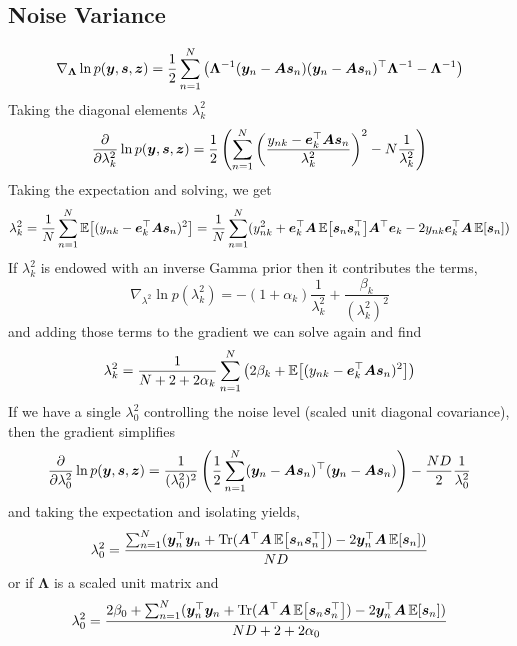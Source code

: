 \documentclass{article}
\newcommand{\mix}{\bm{A}}
\newcommand{\source}{s}
\newcommand{\sourcevec}{\bm{\source}}
\newcommand{\obs}{y}
\newcommand{\obsvec}{\bm{\obs}}
\newcommand{\assign}{z}
\newcommand{\assignvec}{\bm{\assign}}
\newcommand{\noisecov}{\bm{\Lambda}}
\newcommand{\noisescalesq}{\lambda^2}
\begin{document}
\subsection{Noise Variance}
\begin{equation}
\nabla_{\noisecov}\ln p(\obsvec,\sourcevec,\assignvec)=\frac{1}{2}\sum_{n=1}^{N}\left(\noisecov^{-1}(\obsvec_n-\mix\sourcevec_n)(\obsvec_n-\mix\sourcevec_n)\T\noisecov^{-1}-\noisecov^{-1}\right)
\end{equation}
Taking the diagonal elements $\noisescalesq_k$
\begin{equation}
\pdv{\noisescalesq_{k}}\ln p(\obsvec,\sourcevec,\assignvec)=\frac{1}{2}\left(\sum_{n=1}^{N}\left(\frac{\obs_{nk}-\bm{e}_k\T\mix\sourcevec_n}{\noisescalesq_{k}}\right)^2-N\frac{1}{\noisescalesq_k}\right)
\end{equation}
Taking the expectation and solving, we get
\begin{equation}
\noisescalesq_k=\frac{1}{N}\sum_{n=1}^{N}\E{(\obs_{nk}-\bm{e}_k\T\mix\sourcevec_n)^2}=\frac{1}{N}\sum_{n=1}^{N}(\obs_{nk}^2+\bm{e}_k\T\mix\E{\sourcevec_n\sourcevec_n\T}\mix\T\bm{e}_k-2\obs_{nk}\bm{e}_k\T\mix\E{\sourcevec_n})
\end{equation}
If $\noisescalesq_k$ is endowed with an inverse Gamma prior then it contributes the terms,
\begin{equation}
\nabla_{\noisescalesq}\ln p(\noisescalesq_k)=-(1+\alpha_k)\frac{1}{\noisescalesq_k}+\frac{\beta_k}{(\noisescalesq_k)^2}
\end{equation}
and adding those terms to the gradient we can solve again and find
\begin{equation*}
\noisescalesq_k=\frac{1}{N+2+2\alpha_k}\sum_{n=1}^{N}\left(2\beta_k+\E{(\obs_{nk}-\bm{e}_k\T\mix\sourcevec_n)^2}\right)
\end{equation*}
If we have a single $\noisescalesq_0$ controlling the noise level (scaled unit diagonal covariance), then the gradient simplifies
\begin{equation}
\pdv{\noisescalesq_{0}}\ln p(\obsvec,\sourcevec,\assignvec)=\frac{1}{(\noisescalesq_0)^2}\left(\frac{1}{2}\sum_{n=1}^{N}(\obsvec_n-\mix\sourcevec_n)\T(\obsvec_n-\mix\sourcevec_n)\right)-\frac{ND}{2}\frac{1}{\noisescalesq_0}
\end{equation}
and taking the expectation and isolating yields,
\begin{equation}
\noisescalesq_0=\frac{\sum_{n=1}^{N}(\obsvec_n\T\obsvec_n+\Trace(\mix\T\mix\E{\sourcevec_n\sourcevec_n\T})-2\obsvec_n\T\mix\E{\sourcevec_n})}{ND}
\end{equation}
or if $\noisecov$ is a scaled unit matrix and 
\begin{equation}
\noisescalesq_0=\frac{2\beta_0+\sum_{n=1}^{N}(\obsvec_n\T\obsvec_n+\Trace(\mix\T\mix\E{\sourcevec_n\sourcevec_n\T})-2\obsvec_n\T\mix\E{\sourcevec_n})}{ND+2+2\alpha_0}
\end{equation}
\end{document}
